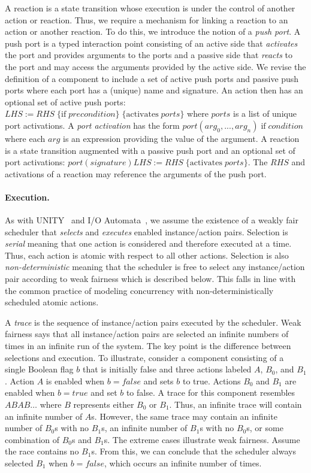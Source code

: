 A reaction is a state transition whose execution is under the control of another action or reaction.
Thus, we require a mechanism for linking a reaction to an action or another reaction.
To do this, we introduce the notion of a \emph{push port}.
A push port is a typed interaction point consisting of an active side that \emph{activates} the port and provides arguments to the ports and a passive side that \emph{reacts} to the port and may access the arguments provided by the active side.
We revise the definition of a component to include a set of active push ports and passive push ports where each port has a (unique) name and signature.
An action then has an optional set of active push ports: $LHS := RHS \; \{ \mathrm{if} \; precondition \} \; \{\mathrm{activates} \; ports \}$ where $ports$ is a list of unique port activations.
A \emph{port activation} has the form $port(arg_0, ..., arg_n) \; \mathrm{if} \; condition$ where each $arg$ is an expression providing the value of the argument.
A reaction is a state transition augmented with a passive push port and an optional set of port activations: $port(signature) LHS := RHS \; \{ \mathrm{activates } \; ports \}$.
The $RHS$ and activations of a reaction may reference the arguments of the push port.

\paragraph{Execution.}
As with UNITY~\cite{chandy1989parallel} and I/O Automata~\cite{nancy1996distributed}, we assume the existence of a weakly fair scheduler that \emph{selects} and \emph{executes} enabled instance/action pairs.
Selection is \emph{serial} meaning that one action is considered and therefore executed at a time.
Thus, each action is atomic with respect to all other actions.
Selection is also \emph{non-deterministic} meaning that the scheduler is free to select any instance/action pair according to weak fairness which is described below.
This falls in line with the common practice of modeling concurrency with non-deterministically scheduled atomic actions.

A \emph{trace} is the sequence of instance/action pairs executed by the scheduler.
Weak fairness says that all instance/action pairs are selected an infinite numbers of times in an infinite run of the system.
The key point is the difference between selections and execution.
To illustrate, consider a component consisting of a single Boolean flag $b$ that is initially false and three actions labeled $A$, $B_0$, and $B_1$.
Action $A$ is enabled when $b = false$ and sets $b$ to true.
Actions $B_0$ and $B_1$ are enabled when $b = true$ and set $b$ to false.
A trace for this component resembles $ABAB \ldots$ where $B$ represents either $B_0$ or $B_1$.
Thus, an infinite trace will contain an infinite number of $A$s.
However, the same trace may contain an infinite number of $B_0$s with no $B_1$s, an infinite number of $B_1$s with no $B_0$s, or some combination of $B_0$s and $B_1$s.
The extreme cases illustrate weak fairness.
Assume the race contains no $B_1$s.
From this, we can conclude that the scheduler always selected $B_1$ when $b = false$, which occurs an infinite number of times.

